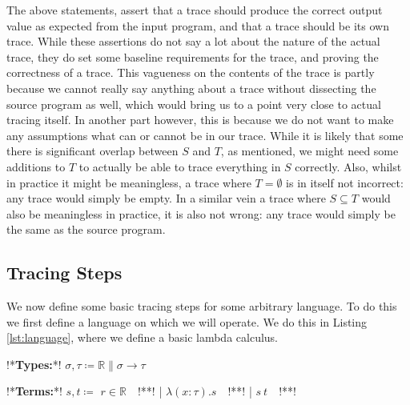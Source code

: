         The above statements, assert that a trace should produce the correct output value as expected from the input program, and that a trace should be its own trace.
        While these assertions do not say a lot about the nature of the actual trace, they do set some baseline requirements for the trace, and proving the correctness of a trace.
        This vagueness on the contents of the trace is partly because we cannot really say anything about a trace without dissecting the source program as well, which would bring us to a point very close to actual tracing itself.
        In another part however, this is because we do not want to make any assumptions what can or cannot be in our trace.
        While it is likely that some there is significant overlap between $S$ and $T$, as mentioned, we might need some additions to $T$ to actually be able to trace everything in $S$ correctly.
        Also, whilst in practice it might be meaningless, a trace where $T=\emptyset$ is in itself not incorrect: any trace would simply be empty.
        In a similar vein a trace where $S\subseteq T$ would also be meaningless in practice, it is also not wrong: any trace would simply be the same as the source program.

    \subsection{Tracing Steps} \label{sec:steps}
        We now define some basic tracing steps for some arbitrary language.
        To do this we first define a language on which we will operate.
        We do this in Listing \ref{lst:language}, where we define a basic lambda calculus.

        \begin{quicklst}[caption=Basic language, label=lst:language, gobble=12]
            !*\textbf{Types:}*!
                $\sigma,\tau\coloneqq\mathbb{R}\|\sigma\to\tau$

            !*\textbf{Terms:}*!
                $s,t\coloneqq$
                    $r\in\mathbb{R}\quad$!**!
                  | $\lambda(x:\tau).s\quad$!**!
                  | $s\ t\quad$!**!
        \end{quicklst}

